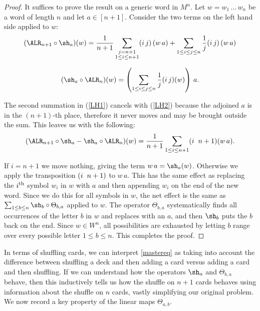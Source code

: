 \documentclass[11pt]{report}
\begin{document}
\begin{proof}
	It suffices to prove the result on a generic word in $M^{n}$.
	Let $w=w_1 \, \ldots \, w_n$ be a word of length $n$ and let $a 
	\in [n+1]$.
	Consider the two terms on the left hand side applied to $w$:	
	\begin{eqnarray}
	\label{LH1}
	(\ALR_{n+1} \circ \sh_{a})(w) = 
	\frac{1}{n+1}\sum_{\substack{j=n+1 \\ 
			1 \leq i \leq n+1}} (i\,j)\,  (w\, a) + 
	\sum_{1 \leq i \leq j \leq n}\frac{1}{j} (i\,j) \, (w \, a)
	\end{eqnarray}
	
	\begin{eqnarray}
	\label{LH2}
	(\sh_{a} \circ \ALR_{n})(w) = \left(\sum_{1 \leq i \leq j \leq n
	}\frac{1}{j} (i\,j)(w) \right) \, a.
	\end{eqnarray}
	
	The second summation in (\ref{LH1}) cancels with (\ref{LH2}) 
	because the adjoined $a$ is in the $(n+1)$-th place, therefore it never 
	moves and may be brought outside the sum.
	This leaves us with the following:
	\begin{eqnarray}
	\label{leftover}
	(\ALR_{n+1} \circ \sh_{a} - \sh_{a} \circ \ALR_{n})(w) 
	= \frac{1}{n+1}	\sum_{1 \leq i \leq n+1} (i \hspace{0.2cm} n+1)  
	(w\, a).
	\end{eqnarray}
	
	
	If $i=n+1$ we move nothing, giving the term $w\, a = \sh_{a}(w)$. 
	Otherwise we apply the transposition 
	$(i \hspace{0.2cm} n+1)$ to $w \, a$.
	This has the same effect as replacing the $i^{\rm th}$ symbol $w_i$ in 
	$w$ with $a$ and then appending $w_i$ on the end of the new word. 		 
	Since we do this for all symbols in $w$, the net effect is the same as 
	$\sum_{1\leq b \leq n} \sh_b \circ \Theta_{b,a}$ applied to $w$. 
	The operator $\Theta_{b,a}$ systematically 
	finds all occurrences of the letter $b$ in $w$ and replaces with an 
	$a$, 	and then $\sh_b$ puts the $b$ back on the end. Since $w \in W^n$,
	all possibilities are exhausted by letting $b$ range over every 
	possible letter $1\leq b \leq n$. 
	This completes the proof. 
\end{proof}

In terms of shuffling cards, we can interpret \eqref{mastereq} as taking 
into 
account the difference between shuffling a deck and then adding a card 
versus 
adding a card and then shuffling.
If we can understand how the operators $\sh_{a}$ and $\Theta_{b,a}$ behave, 
then this inductively tells us how the shuffle on 
$n+1$ cards behaves using information about the shuffle on $n$ cards, 
vastly simplifying our original problem. We now record a key property of 
the linear maps $\Theta_{a,b}$.
\end{document}
